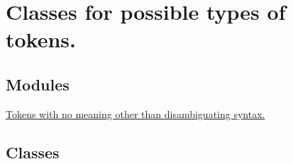 \hypertarget{group___tokens}{}\section{Classes for possible types of tokens.}
\label{group___tokens}
\subsection*{Modules}
\begin{DoxyCompactItemize}
\item 
\hyperlink{group___empty}{Tokens with no meaning other than disambiguating syntax.}
\end{DoxyCompactItemize}
\subsection*{Classes}
